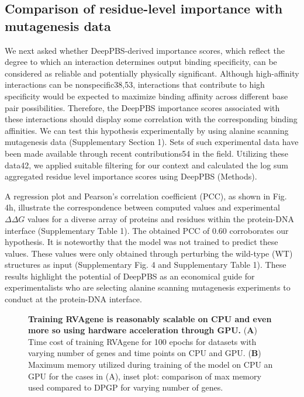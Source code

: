 \subsection{Comparison of residue-level importance with mutagenesis data}
We next asked whether DeepPBS-derived importance scores, which reflect the degree to which an interaction determines output binding specificity, can be considered as reliable and potentially physically significant. Although high-affinity interactions can be nonspecific38,53, interactions that contribute to high specificity would be expected to maximize binding affinity across different base pair possibilities. Therefore, the DeepPBS importance scores associated with these interactions should display some correlation with the corresponding binding affinities. We can test this hypothesis experimentally by using alanine scanning mutagenesis data (Supplementary Section 1). Sets of such experimental data have been made available through recent contributions54 in the field. Utilizing these data42, we applied suitable filtering for our context and calculated the log sum aggregated residue level importance scores using DeepPBS (Methods).
\par
A regression plot and Pearson’s correlation coefficient (PCC), as shown in Fig. 4h, illustrate the correspondence between computed values and experimental $\Delta\Delta G$ values for a diverse array of proteins and residues within the protein-DNA interface (Supplementary Table 1). The obtained PCC of 0.60 corroborates our hypothesis. It is noteworthy that the model was not trained to predict these values. These values were only obtained through perturbing the wild-type (WT) structures as input (Supplementary Fig. 4 and Supplementary Table 1). These results highlight the potential of DeepPBS as an economical guide for experimentalists who are selecting alanine scanning mutagenesis experiments to conduct at the protein-DNA interface.

\begin{center}
    \begin{figure}
        \caption[Computational cost of training RVAgene]{\textbf{Training RVAgene is reasonably scalable on CPU and even more so using hardware acceleration through GPU.} ({\bf A}) Time cost of training RVAgene for 100 epochs for datasets with varying number of genes and time points on CPU and GPU. ({\bf B}) Maximum memory utilized during training of the model on CPU an GPU for the cases in (A), inset plot: comparison of max memory used compared to DPGP for varying number of genes.}
  \label{fig:pdna4}
\end{figure}
\end{center}
